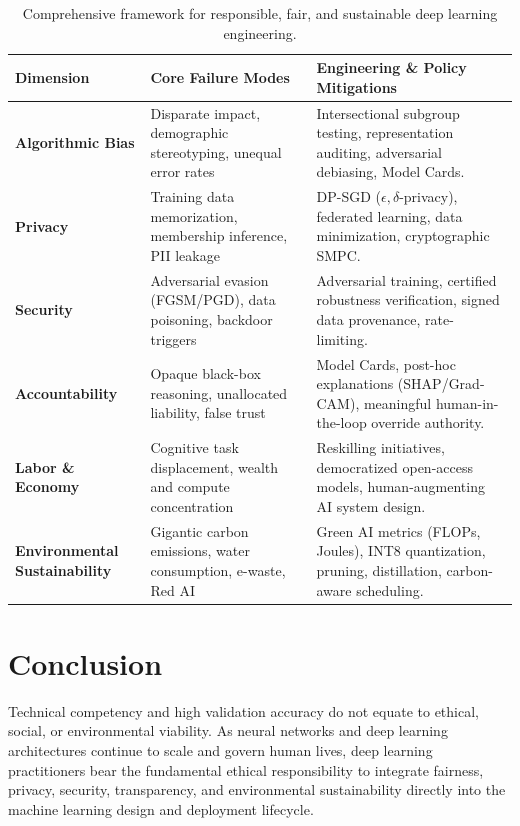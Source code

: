 \documentclass[12pt,a4paper]{article}
\begin{document}
\begin{table}[h!]
\centering
\small
\begin{tabular}{p{3.2cm}p{4.5cm}p{6.8cm}}
\toprule
\textbf{Dimension} & \textbf{Core Failure Modes} & \textbf{Engineering \& Policy Mitigations} \\
\midrule
\textbf{Algorithmic Bias} & Disparate impact, demographic stereotyping, unequal error rates & Intersectional subgroup testing, representation auditing, adversarial debiasing, Model Cards. \\
\addlinespace
\textbf{Privacy} & Training data memorization, membership inference, PII leakage & DP-SGD ($\epsilon,\delta$-privacy), federated learning, data minimization, cryptographic SMPC. \\
\addlinespace
\textbf{Security} & Adversarial evasion (FGSM/PGD), data poisoning, backdoor triggers & Adversarial training, certified robustness verification, signed data provenance, rate-limiting. \\
\addlinespace
\textbf{Accountability} & Opaque black-box reasoning, unallocated liability, false trust & Model Cards, post-hoc explanations (SHAP/Grad-CAM), meaningful human-in-the-loop override authority. \\
\addlinespace
\textbf{Labor \& Economy} & Cognitive task displacement, wealth and compute concentration & Reskilling initiatives, democratized open-access models, human-augmenting AI system design. \\
\addlinespace
\textbf{Environmental Sustainability} & Gigantic carbon emissions, water consumption, e-waste, Red AI & Green AI metrics (FLOPs, Joules), INT8 quantization, pruning, distillation, carbon-aware scheduling. \\
\bottomrule
\end{tabular}
\caption{Comprehensive framework for responsible, fair, and sustainable deep learning engineering.}
\label{tab:governance}
\end{table}

\section{Conclusion}
Technical competency and high validation accuracy do not equate to ethical, social, or environmental viability. As neural networks and deep learning architectures continue to scale and govern human lives, deep learning practitioners bear the fundamental ethical responsibility to integrate fairness, privacy, security, transparency, and environmental sustainability directly into the machine learning design and deployment lifecycle.
\end{document}
